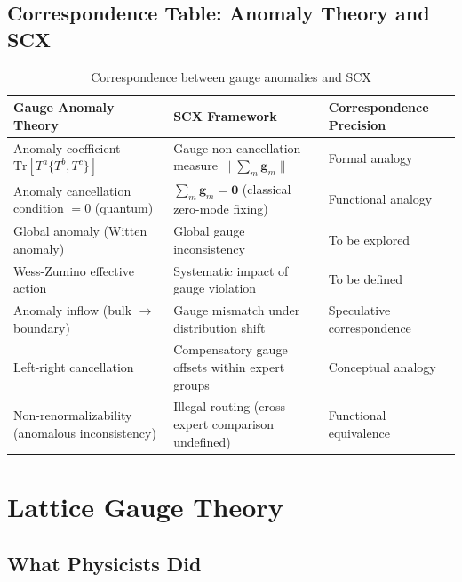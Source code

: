 \documentclass[12pt,a4paper]{article}
\theoremstyle{remark}
\newcommand{\Tr}{\mathrm{Tr}}
\newcommand{\gaugeparam}{\mathbf{g}}
\begin{document}
\subsection{Correspondence Table: Anomaly Theory and SCX}

\begin{table}[H]
\centering
\caption{Correspondence between gauge anomalies and SCX}
\label{tab:anomaly_correspondence}
\begin{tabular}{p{4.5cm} p{4.5cm} p{4.5cm}}
\toprule
\textbf{Gauge Anomaly Theory} & \textbf{SCX Framework} & \textbf{Correspondence Precision} \\
\midrule
Anomaly coefficient $\Tr[T^a\{T^b,T^c\}]$ & Gauge non-cancellation measure $\|\sum_m\gaugeparam_m\|$ & Formal analogy \\
Anomaly cancellation condition $=0$ (quantum) & $\sum_m \gaugeparam_m = \mathbf{0}$ (classical zero-mode fixing) & Functional analogy \\
Global anomaly (Witten anomaly) & Global gauge inconsistency & To be explored \\
Wess-Zumino effective action & Systematic impact of gauge violation & To be defined \\
Anomaly inflow (bulk $\to$ boundary) & Gauge mismatch under distribution shift & Speculative correspondence \\
Left-right cancellation & Compensatory gauge offsets within expert groups & Conceptual analogy \\
Non-renormalizability (anomalous inconsistency) & Illegal routing (cross-expert comparison undefined) & Functional equivalence \\
\bottomrule
\end{tabular}
\end{table}

\newpage

\section{Lattice Gauge Theory}

\subsection{What Physicists Did}
\end{document}
